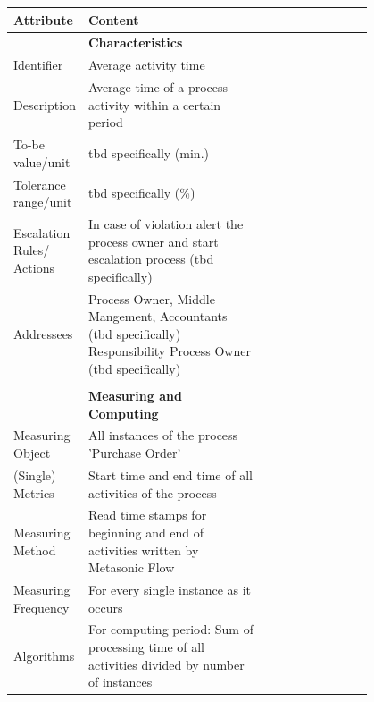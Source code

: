 \begin{table}[htbp]
	\footnotesize
	\centering
	\begin{tabular}[t]{@{}l p{0.5\linewidth} p{0.3\linewidth} @{}}
		\toprule
		\textbf{Attribute} & \textbf{Content}  \\
		\midrule
		 & \textbf{Characteristics}
		\\
		Identifier & Average activity time
		\\
		Description & Average time of a process activity within a certain period
		\\
		To-be value/unit & tbd specifically (min.)
		\\
		Tolerance range/unit & tbd specifically (\%)
		\\
		Escalation Rules/ Actions & In case of violation alert the process owner and start escalation process (tbd specifically)
		\\
		Addressees & Process Owner, Middle Mangement, Accountants (tbd specifically)
		Responsibility	Process Owner (tbd specifically)
		\\
		&  &
		\\
		& \textbf{Measuring and Computing}
		\\
		Measuring Object & All instances of the process 'Purchase Order'
		\\
		(Single) Metrics & Start time and end time of all activities of the process
		\\
		Measuring Method & Read time stamps for beginning and end of activities written by Metasonic Flow 
		\\
		Measuring Frequency & For every single instance as it occurs
		\\
		Algorithms & For computing period: Sum of processing time of all activities divided by number of instances


\end{tabular}
\end{table}
